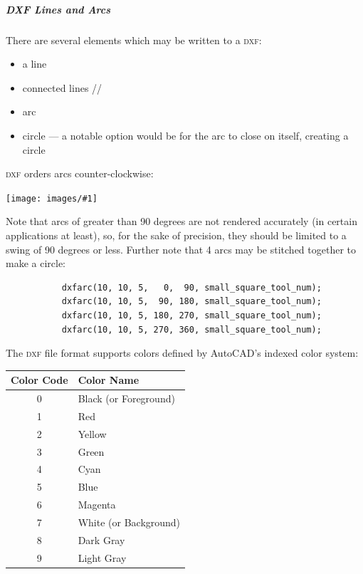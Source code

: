 \documentclass{ltxdoc}
\newcommand{\includeimage}[1]{\bigskip\noindent\texttt{[image: images/\#1]}\bigskip}
\begin{document}

\subparagraph*{DXF Lines and Arcs}%
 
There are several elements which may be written to a \textsc{dxf}:

\begin{itemize}
 \item a line %
 \item connected lines //
 \item arc 
 \item circle --- a notable option would be for the arc to close on itself, creating a circle 
\end{itemize}
 
\textsc{dxf} orders arcs counter-clockwise:

\includeimage{arcs_circle_degrees.pdf}%

Note that arcs of greater than 90 degrees are not rendered accurately (in certain applications at least), so, for the sake of precision, they should be limited to a swing of 90 degrees or less. Further note that 4 arcs may be stitched together to make a circle:
 
\begin{verbatim}
           dxfarc(10, 10, 5,   0,  90, small_square_tool_num);
           dxfarc(10, 10, 5,  90, 180, small_square_tool_num);
           dxfarc(10, 10, 5, 180, 270, small_square_tool_num);
           dxfarc(10, 10, 5, 270, 360, small_square_tool_num);
\end{verbatim}
 
%
%

The \textsc{dxf} file format supports colors defined by AutoCAD's indexed color system:

\begin{center}
\noindent\begin{tabular}{cl}
Color Code & Color Name \\
\toprule
     0 & Black (or Foreground)  \\
     1 & Red \\
     2 & Yellow \\
     3 & Green  \\
     4 & Cyan  \\
     5 & Blue \\
     6 & Magenta \\ 
     7 & White (or Background)\\
     8 & Dark Gray \\ 
     9 & Light Gray \\\bottomrule
\end{tabular}
\end{center}
\end{document}
